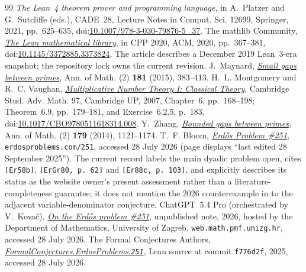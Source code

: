 \documentclass[11pt]{article}
\begin{document}
\begin{thebibliography}{99}
  {\emph{The Lean~4 theorem prover and programming language}},
  in A.~Platzer and G.~Sutcliffe (eds.), CADE~28,
  Lecture Notes in Comput. Sci. 12699, Springer, 2021, pp.~625--635,
  doi:\href{https://doi.org/10.1007/978-3-030-79876-5_37}
  {10.1007/978-3-030-79876-5\_37}.
 The mathlib Community,
  \href{https://doi.org/10.1145/3372885.3373824}
  {\emph{The Lean mathematical library}},
  in CPP 2020, ACM, 2020, pp.~367--381,
  doi:\href{https://doi.org/10.1145/3372885.3373824}
  {10.1145/3372885.3373824}.  The article describes a December 2019
  Lean~3-era snapshot; the repository lock owns the current revision.
 J.~Maynard,
  \href{https://doi.org/10.4007/annals.2015.181.1.7}
  {\emph{Small gaps between primes}},
  Ann. of Math. (2) \textbf{181} (2015), 383--413.
 H.~L. Montgomery and R.~C. Vaughan,
  \href{https://doi.org/10.1017/CBO9780511618314.008}
  {\emph{Multiplicative Number Theory I: Classical Theory}},
  Cambridge Stud. Adv. Math. 97, Cambridge UP, 2007,
  Chapter~6, pp.~168--198; Theorem~6.9, pp.~179--181, and
  Exercise~6.2.5, p.~183,
  doi:\href{https://doi.org/10.1017/CBO9780511618314.008}
  {10.1017/CBO9780511618314.008}.
 Y.~Zhang,
  \href{https://doi.org/10.4007/annals.2014.179.3.7}
  {\emph{Bounded gaps between primes}},
  Ann. of Math. (2) \textbf{179} (2014), 1121--1174.
 T.~F. Bloom,
  \href{https://www.erdosproblems.com/251}{\emph{Erd\H{o}s Problem \#251}},
  \texttt{erdosproblems.com/251}, accessed 28 July 2026 (page displays
  ``last edited 28 September 2025'').  The current record labels the main
  dyadic problem open, cites \texttt{[Er58b]}, \texttt{[ErGr80, p.~62]} and
  \texttt{[Er88c, p.~103]}, and explicitly describes its status as the
  website owner's present assessment rather than a literature-completeness
  guarantee; it does not mention the 2026 counterexample in
  \cite{kovac2026} to the adjacent variable-denominator conjecture.
 ChatGPT~5.4 Pro (orchestrated by V.~Kova\v{c}),
  \href{https://web.math.pmf.unizg.hr/~vjekovac/files/Erdos_problem_251.pdf}
  {\emph{On the Erd\H{o}s problem \#251}},
  unpublished note, 2026, hosted by the Department of Mathematics, University
  of Zagreb, \texttt{web.math.pmf.unizg.hr}, accessed 28 July 2026.
 The Formal Conjectures Authors,
  \href{https://github.com/google-deepmind/formal-conjectures/blob/f776d2f2039351b00737ffcafb9d7d7666e1d9af/FormalConjectures/ErdosProblems/251.lean}
  {\emph{FormalConjectures.ErdosProblems.\texttt{251}}},
  Lean source at commit \texttt{f776d2f}, 2025, accessed 28 July 2026.
\end{thebibliography}

\companionpapercontext
\end{document}
